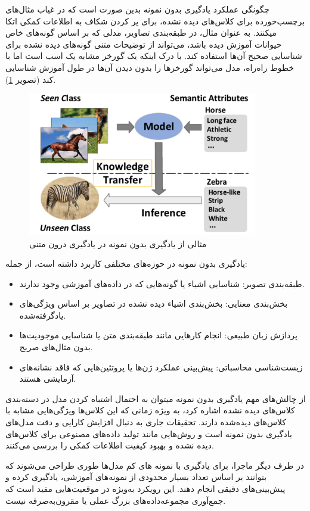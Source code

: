 چگونگی عملکرد یادگیری بدون نمونه بدین صورت است که در غیاب مثال‌های برچسب‌خورده برای کلاس‌های دیده نشده، برای پر کردن شکاف به اطلاعات کمکی اتکا می\/کنند. به عنوان مثال، در طبقه‌بندی تصاویر، مدلی که بر اساس گونه‌های خاص حیوانات آموزش دیده باشد، می‌تواند از توضیحات متنی گونه‌های دیده نشده برای شناسایی صحیح آن‌ها استفاده کند. با درک اینکه یک گورخر مشابه یک اسب است اما با خطوط راه‌راه، مدل می‌تواند گورخرها را بدون دیدن آن‌ها در طول آموزش شناسایی کند (تصویر \ref{fig_zil}).

\begin{figure}[!t]
	\centering
	\includegraphics[width=100mm]{images/ZeroShot}
	\caption{مثالی از یادگیری بدون نمونه در یادگیری درون متنی}
	\label{fig_zil}
\end{figure}

یادگیری بدون نمونه در حوزه‌های مختلفی کاربرد داشته است، از جمله:
\begin{itemize}
	\item 
	طبقه‌بندی تصویر: شناسایی اشیاء یا گونه‌هایی که در داده‌های آموزشی وجود ندارند.
	\item 
	بخش‌بندی معنایی: بخش‌بندی اشیاء دیده نشده در تصاویر بر اساس ویژگی‌های یادگرفته‌شده.
	\item 
	پردازش زبان طبیعی: انجام کارهایی مانند طبقه‌بندی متن یا شناسایی موجودیت‌ها بدون مثال‌های صریح.
	\item 
	زیست‌شناسی محاسباتی: پیش‌بینی عملکرد ژن‌ها یا پروتئین‌هایی که فاقد نشانه‌های آزمایشی هستند.  
\end{itemize}

از چالش‌های مهم یادگیری بدون نمونه می\/توان به احتمال اشتباه کردن مدل در دسته‌بندی کلاس‌های دیده نشده اشاره کرد، به ویژه زمانی که این کلاس‌ها ویژگی‌هایی مشابه با کلاس‌های دیده‌شده دارند. تحقیقات جاری به دنبال افزایش کارایی و دقت مدل‌های یادگیری بدون نمونه است و روش‌هایی مانند تولید داده‌های مصنوعی برای کلاس‌های دیده نشده و بهبود کیفیت اطلاعات کمکی را بررسی می‌کنند.

در طرف دیگر ماجرا، برای یادگیری با نمونه های کم \cite{FSL} مدل‌ها طوری طراحی می‌شوند که بتوانند بر اساس تعداد بسیار محدودی از نمونه‌های آموزشی، یادگیری کرده و پیش‌بینی‌های دقیقی انجام دهند. این رویکرد به‌ویژه در موقعیت‌هایی مفید است که جمع‌آوری مجموعه‌داده‌های بزرگ عملی یا مقرون‌به‌صرفه نیست.

